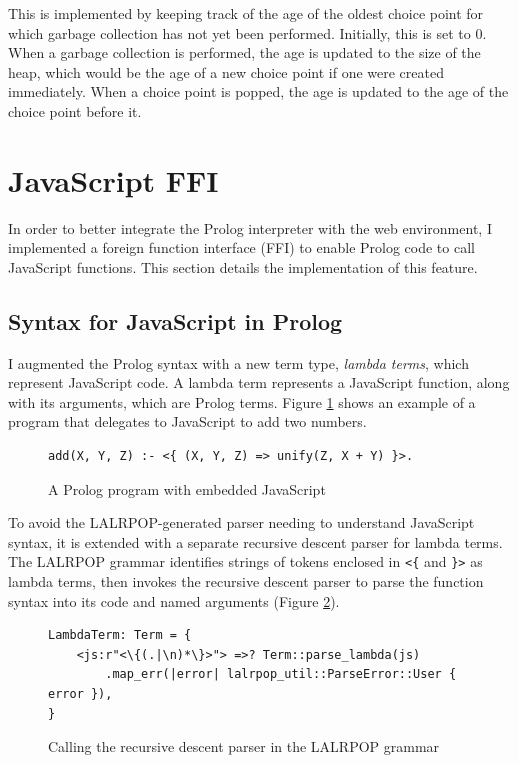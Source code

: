 This is implemented by keeping track of the age of the oldest choice point for which garbage collection has not yet been performed. Initially, this is set to 0. When a garbage collection is performed, the age is updated to the size of the heap, which would be the age of a new choice point if one were created immediately. When a choice point is popped, the age is updated to the age of the choice point before it.

\section{JavaScript FFI}

\label{sec:js-ffi}

In order to better integrate the Prolog interpreter with the web environment, I implemented a foreign function interface (FFI) to enable Prolog code to call JavaScript functions. This section details the implementation of this feature.

\subsection{Syntax for JavaScript in Prolog}

I augmented the Prolog syntax with a new term type, \emph{lambda terms}, which represent JavaScript code. A lambda term represents a JavaScript function, along with its arguments, which are Prolog terms. Figure \ref{fig:js-in-prolog} shows an example of a program that delegates to JavaScript to add two numbers.

\begin{figure}[H]
\centering
\begin{verbatim}
add(X, Y, Z) :- <{ (X, Y, Z) => unify(Z, X + Y) }>.
\end{verbatim}
\caption{A Prolog program with embedded JavaScript}
\label{fig:js-in-prolog}
\end{figure}

To avoid the LALRPOP-generated parser needing to understand JavaScript syntax, it is extended with a separate recursive descent parser for lambda terms. The LALRPOP grammar identifies strings of tokens enclosed in \texttt{<\{} and \texttt{\}>} as lambda terms, then invokes the recursive descent parser to parse the function syntax into its code and named arguments (Figure \ref{fig:js-grammar}).

\begin{figure}[H]
\centering
\begin{verbatim}
LambdaTerm: Term = {
    <js:r"<\{(.|\n)*\}>"> =>? Term::parse_lambda(js)
        .map_err(|error| lalrpop_util::ParseError::User { error }),
}
\end{verbatim}
\caption{Calling the recursive descent parser in the LALRPOP grammar}
\label{fig:js-grammar}
\end{figure}

